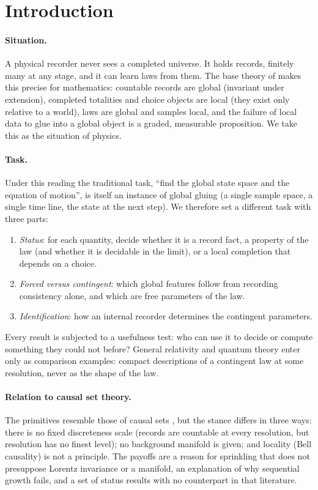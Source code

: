\documentclass[11pt]{article}
\theoremstyle{definition}
\theoremstyle{remark}
\begin{document}
\tableofcontents
\bigskip

\section{Introduction}

\paragraph{Situation.} A physical recorder never sees a completed universe. It holds records, finitely many at any stage, and it can learn laws from them. The base theory of \cite{pzfc} makes this precise for mathematics: countable records are global (invariant under extension), completed totalities and choice objects are local (they exist only relative to a world), laws are global and samples local, and the failure of local data to glue into a global object is a graded, measurable proposition. We take this as the situation of physics.

\paragraph{Task.} Under this reading the traditional task, ``find the global state space and the equation of motion'', is itself an instance of global gluing (a single sample space, a single time line, the state at the next step). We therefore set a different task with three parts:
\begin{enumerate}[nosep]
\item \emph{Status}: for each quantity, decide whether it is a record fact, a property of the law (and whether it is decidable in the limit), or a local completion that depends on a choice.
\item \emph{Forced versus contingent}: which global features follow from recording consistency alone, and which are free parameters of the law.
\item \emph{Identification}: how an internal recorder determines the contingent parameters.
\end{enumerate}
Every result is subjected to a usefulness test: who can use it to decide or compute something they could not before? General relativity and quantum theory enter only as comparison examples: compact descriptions of a contingent law at some resolution, never as the shape of the law.

\paragraph{Relation to causal set theory.} The primitives resemble those of causal sets \cite{blms}, but the stance differs in three ways: there is no fixed discreteness scale (records are countable at every resolution, but resolution has no finest level); no background manifold is given; and locality (Bell causality) is not a principle. The payoffs are a reason for sprinkling that does not presuppose Lorentz invariance or a manifold, an explanation of why sequential growth fails, and a set of status results with no counterpart in that literature.
\end{document}
